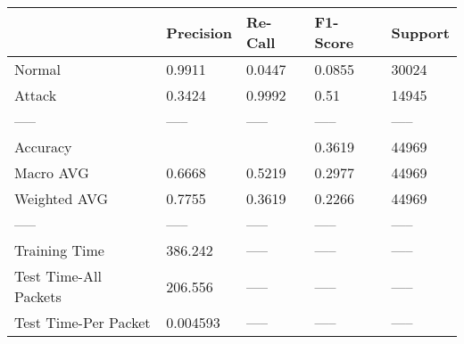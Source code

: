 \begin{tabular}{lllll}
\toprule
{} & Precision & Re-Call & F1-Score & Support \\
\midrule
Normal                &    0.9911 &  0.0447 &   0.0855 &   30024 \\
Attack                &    0.3424 &  0.9992 &     0.51 &   14945 \\
-----                 &     ----- &   ----- &    ----- &   ----- \\
Accuracy              &           &         &   0.3619 &   44969 \\
Macro AVG             &    0.6668 &  0.5219 &   0.2977 &   44969 \\
Weighted AVG          &    0.7755 &  0.3619 &   0.2266 &   44969 \\
-----                 &     ----- &   ----- &    ----- &   ----- \\
Training Time         &   386.242 &   ----- &    ----- &   ----- \\
Test Time-All Packets &   206.556 &   ----- &    ----- &   ----- \\
Test Time-Per Packet  &  0.004593 &   ----- &    ----- &   ----- \\
\bottomrule
\end{tabular}
